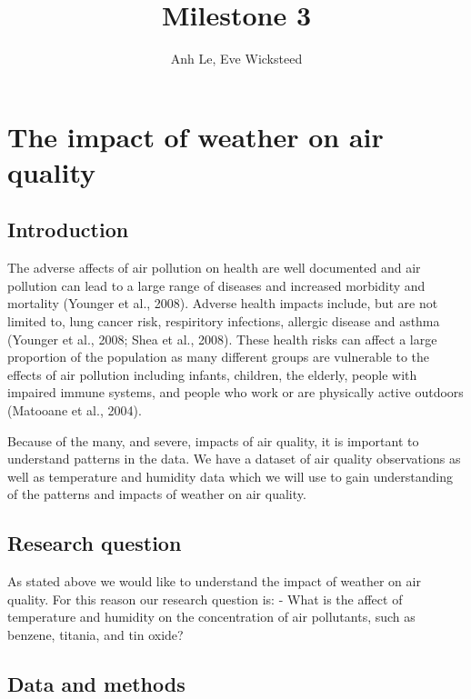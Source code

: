 \documentclass[]{article}
\title{Milestone 3}
\author{Anh Le, Eve Wicksteed}
\date{}
\begin{document}
\maketitle

\hypertarget{the-impact-of-weather-on-air-quality}{%
\section{The impact of weather on air
quality}\label{the-impact-of-weather-on-air-quality}}

\hypertarget{introduction}{%
\subsection{Introduction}\label{introduction}}

The adverse affects of air pollution on health are well documented and
air pollution can lead to a large range of diseases and increased
morbidity and mortality (Younger et al., 2008). Adverse health impacts
include, but are not limited to, lung cancer risk, respiritory
infections, allergic disease and asthma (Younger et al., 2008; Shea et
al., 2008). These health risks can affect a large proportion of the
population as many different groups are vulnerable to the effects of air
pollution including infants, children, the elderly, people with impaired
immune systems, and people who work or are physically active outdoors
(Matooane et al., 2004).

Because of the many, and severe, impacts of air quality, it is important
to understand patterns in the data. We have a dataset of air quality
observations as well as temperature and humidity data which we will use
to gain understanding of the patterns and impacts of weather on air
quality.

\hypertarget{research-question}{%
\subsection{Research question}\label{research-question}}

As stated above we would like to understand the impact of weather on air
quality. For this reason our research question is: - What is the affect
of temperature and humidity on the concentration of air pollutants, such
as benzene, titania, and tin oxide?

\hypertarget{data-and-methods}{%
\subsection{Data and methods}\label{data-and-methods}}
\end{document}
